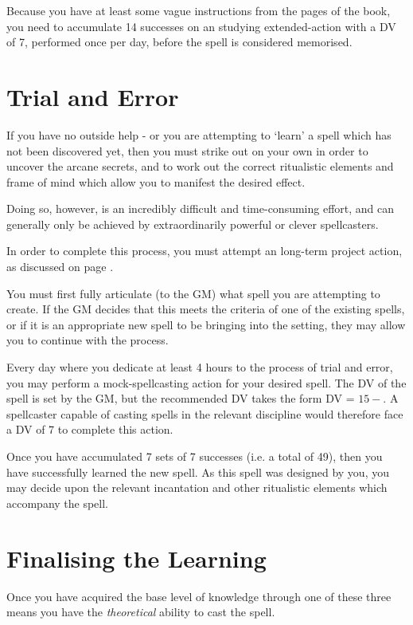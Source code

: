 Because you have at least some vague instructions from the pages of the book, you need to accumulate 14 successes on an studying extended-action with a DV of 7, performed once per day, before the spell is considered memorised. 


\section{Trial and Error}

If you have no outside help - or you are attempting to `learn' a spell which has not been discovered yet, then you must strike out on your own in order to uncover the arcane secrets, and to work out the correct ritualistic elements and frame of mind which allow you to manifest the desired effect. 

Doing so, however, is an incredibly difficult and time-consuming effort, and can generally only be achieved by extraordinarily powerful or clever spellcasters. 

In order to complete this process, you must attempt an long-term project action, as discussed on page \pageref{S:Extended}. 

You must first fully articulate (to the GM) what spell you are attempting to create. If the GM decides that this meets the criteria of one of the existing spells, or if it is an appropriate new spell to be bringing into the setting, they may allow you to continue with the process. 

Every day where you dedicate at least 4 hours to the process of trial and error, you may perform a mock-spellcasting action for your desired spell. The DV of the spell is set by the GM, but the recommended DV takes the form DV = $15 - $. A spellcaster capable of casting \levelSeven{} spells in the relevant discipline would therefore face a DV of 7 to complete this action. 

Once you have accumulated 7 sets of 7 successes (i.e. a total of 49), then you have successfully learned the new spell. As this spell was designed by you, you may decide upon the relevant incantation and other ritualistic elements which accompany the spell.  



\section{Finalising the Learning}

Once you have acquired the base level of knowledge through one of these three means you have the {\it theoretical} ability to cast the spell. 

